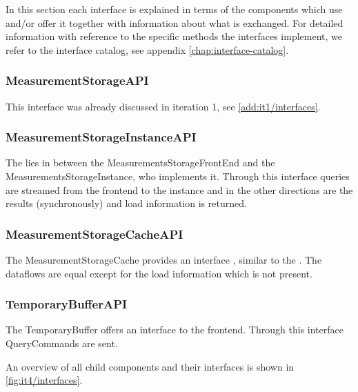 \npar In this section each interface is explained in terms of the components
which use and/or offer it together with information about what is exchanged. For
detailed information with reference to the specific methods the interfaces
implement, we refer to the interface catalog, see appendix
\ref{chap:interface-catalog}.

\subsubsection{MeasurementStorageAPI}

\npar This interface was already discussed in iteration 1, see
\ref{add:it1/interfaces}.

\subsubsection{MeasurementStorageInstanceAPI}

\npar The  lies in between the
MeasurementsStorageFrontEnd and the MeasurementsStorageInstance, who implements
it. Through this interface queries are streamed from the frontend to the
instance and in the other directions are the results (synchronously)
and load information is returned.

\subsubsection{MeasurementStorageCacheAPI}

\npar The MeasurementStorageCache provides an interface
, similar to the
. The dataflows are equal except for
the load information which is not present.

\subsubsection{TemporaryBufferAPI}

\npar The TemporaryBuffer offers an  interface
to the frontend. Through this interface QueryCommands are sent.

\npar An overview of all child components and their interfaces is shown in
\ref{fig:it4/interfaces}.

